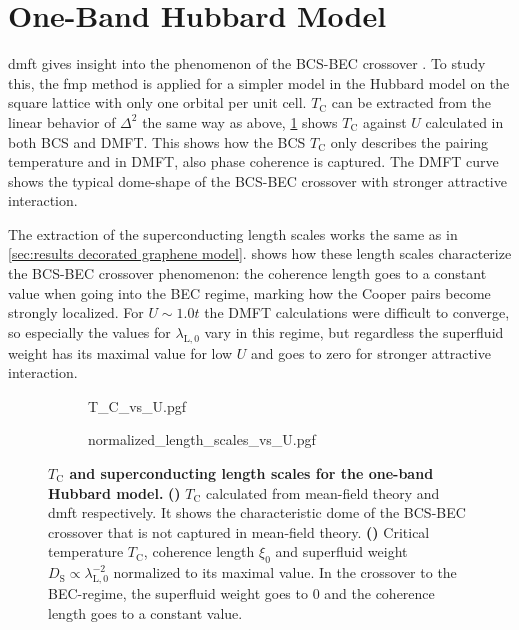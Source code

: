 \documentclass[../notes.tex]{subfiles}
\begin{document}
\section{One-Band Hubbard Model}\label{sec:results OBH}

\Acrshort{dmft} gives insight into the phenomenon of the BCS-BEC crossover \cite{amaricciInhomogeneousBCSBECCrossover2014, suDynamicalClusterQuantum2010, delreDynamicalVertexApproximation2019, petersLocalOriginPseudogap2015}.
To study this, the \gls{fmp} method is applied for a simpler model in the Hubbard model on the square lattice with only one orbital per unit cell.
\(T_{\mathrm{C}}\) can be extracted from the linear behavior of \(\Delta^2\) the same way as above, \cref{sfig:DMFT OBH T_C vs U} shows \(T_{\mathrm{C}}\) against \(U\) calculated in both BCS and DMFT.
This shows how the BCS \(T_{\mathrm{C}}\) only describes the pairing temperature and in DMFT, also phase coherence is captured.
The DMFT curve shows the typical dome-shape of the BCS-BEC crossover with stronger attractive interaction.

The extraction of the superconducting length scales works the same as in \cref{sec:results decorated graphene model}.
 shows how these length scales characterize the BCS-BEC crossover phenomenon: the coherence length goes to a constant value when going into the BEC regime, marking how the Cooper pairs become strongly localized.
For \(U \sim 1.0t\) the DMFT calculations were difficult to converge, so especially the values for \(\lambda_{\mathrm{L}, 0}\) vary in this regime, but regardless the superfluid weight has its maximal value for low \(U\) and goes to zero for stronger attractive interaction.
\begin{figure}[tb]
	\centering
	\begin{subfigure}[b]{0.5\textwidth}
		\centering
		\caption{\hfill\null}\label{sfig:DMFT OBH T_C vs U}
		{T_C_vs_U.pgf}
	\end{subfigure}%
	\begin{subfigure}[b]{0.5\textwidth}
		\centering
		\caption{\hfill\null}\label{sfig:DMFT OBH BCS to BEC crossover}
		{normalized_length_scales_vs_U.pgf}
	\end{subfigure}
	\caption[\(T_{\mathrm{C}}\) and superconducting length scales for the one-band Hubbard model.]{
		\textbf{\(T_{\mathrm{C}}\) and superconducting length scales for the one-band Hubbard model.} \textbf{()} \(T_{\mathrm{C}}\) calculated from mean-field theory and \gls{dmft} respectively. It shows the characteristic dome of the BCS-BEC crossover that is not captured in mean-field theory. \textbf{()} Critical temperature \(T_{\mathrm{C}}\), coherence length \(\xi_0\) and superfluid weight \(D_{\mathrm{S}} \propto \lambda_{\mathrm{L}, 0}^{-2}\) normalized to its maximal value. In the crossover to the BEC-regime, the superfluid weight goes to \(0\) and the coherence length goes to a constant value. 
	}
	\label{fig:DMFT OBH BCS BEC crossover and T_C vs U}
\end{figure}
\end{document}
